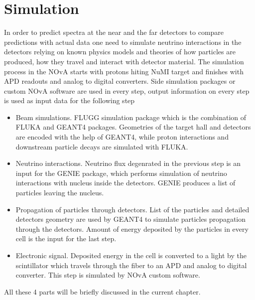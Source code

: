 \chapter{Simulation}
\label{simulation_chapter}

In order to predict spectra at the near and the far detectors to compare predictions with
actual data one need to simulate neutrino interactions in the detectors relying on
known physics models and theories of how particles are produced, how they travel and interact
with detector material. The simulation process in the NOvA starts with protons hiting
NuMI target and finishes with APD readouts and analog to digital converters. Side simulation
packages or custom NOvA software are used in every step, output information on every step is
used as input data for the following step
\begin{itemize}
\item Beam simulations. FLUGG simulation package which is the combination of FLUKA and GEANT4 packages.
Geometries of the target hall and detectors are encoded with the help of GEANT4, while proton
interactions and downstream particle decays are simulated with FLUKA.
\item Neutrino interactions. Neutrino flux degenrated in the previous step is an input for
the GENIE package, which performs simulation of neutrino interactions with nucleus inside the
detectors. GENIE produces a list of particles leaving the nucleus.
\item Propagation of particles through detectors. List of the particles and detailed detectors geometry are
used by GEANT4 to simulate particles propagation through the detectors. Amount of energy deposited
by the particles in every cell is the input for the last step.
\item Electronic signal. Deposited energy in the cell is converted to a light by the scintillator
which travels through the fiber to an APD and analog to digital converter. This step is
simulated by NOvA custom software.
\end{itemize}
All these 4 parts will be briefly discussed in the current chapter.

